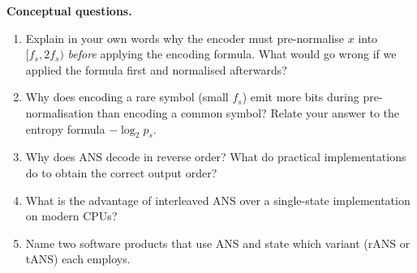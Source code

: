 \begin{exercisebox}
\textbf{Conceptual questions.}
\begin{enumerate}[label=(\alph*)]
  \item Explain in your own words why the encoder must
        pre-normalise $x$ into $[f_s, 2f_s)$ \emph{before}
        applying the encoding formula.  What would go wrong
        if we applied the formula first and normalised
        afterwards?
  \item Why does encoding a rare symbol (small $f_s$) emit
        more bits during pre-normalisation than encoding a
        common symbol?  Relate your answer to the entropy
        formula $-\log_2 p_s$.
  \item Why does ANS decode in reverse order?  What do
        practical implementations do to obtain the correct
        output order?
  \item What is the advantage of interleaved ANS over a
        single-state implementation on modern CPUs?
  \item Name two software products that use ANS and state
        which variant (rANS or tANS) each employs.
\end{enumerate}
\end{exercisebox}
